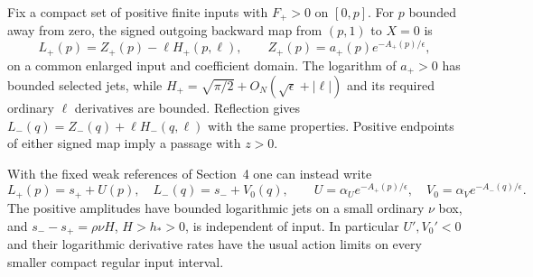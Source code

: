 \begin{lemma}\label{rw:finite:regular-lower}
Fix a compact set of positive finite inputs with $F_+>0$ on $[0,p]$.
For $p$ bounded away from zero, the signed outgoing backward map
from $(p,1)$ to $X=0$ is
\begin{equation}\label{rw:finite:lower-height}
 L_+(p)=Z_+(p)-\ell H_+(p,\ell),\qquad
 Z_+(p)=a_+(p)e^{-A_+(p)/\epsilon},
\end{equation}
on a common enlarged input and coefficient domain. The logarithm of
$a_+>0$ has bounded selected jets, while
$H_+=\sqrt{\pi/2}+O_N(\sqrt\epsilon+|\ell|)$ and its required
ordinary $\ell$ derivatives are bounded. Reflection gives
$L_-(q)=Z_-(q)+\ell H_-(q,\ell)$ with the same properties.
Positive endpoints of either signed map imply a passage with $z>0$.

With the fixed weak references of Section~4 one can instead write
\begin{equation}\label{rw:finite:relative-lower}
 L_+(p)=s_++U(p),\quad L_-(q)=s_-+V_0(q),\qquad
 U=\alpha_Ue^{-A_+(p)/\epsilon},\quad
 V_0=\alpha_Ve^{-A_-(q)/\epsilon}.
\end{equation}
The positive amplitudes have bounded logarithmic jets on a small
ordinary $\nu$ box, and $s_--s_+=\rho\nu H$, $H>h_*>0$,
is independent of input. In particular $U',V_0'<0$ and their
logarithmic derivative rates have the usual action limits on every
smaller compact regular input interval.
\end{lemma}
